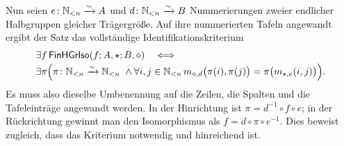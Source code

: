 \documentclass[main.tex]{subfiles}
\begin{document}
\begin{tabproofsplitwide}
  \closeproofpartwide
\end{tabproofsplitwide}

Nun seien \(e\colon\mathbb{N}_{<n}\xrightarrow{\sim} A\) und
\(d\colon\mathbb{N}_{<n}\xrightarrow{\sim} B\) Nummerierungen zweier endlicher
Halbgruppen gleicher Trägergröße.  Auf ihre nummerierten Tafeln
angewandt ergibt der Satz das vollständige Identifikationskriterium
\[
\begin{aligned}
&\exists f\,
  \mathsf{FinHGrIso}\!\left(f;A,\star;B,\diamond\right)
\quad\Longleftrightarrow{}\\[-2pt]
&\exists\pi\Bigl(
  \pi\colon\mathbb{N}_{<n}\xrightarrow{\sim}\mathbb{N}_{<n}\ \land
  \forall i,j\in\mathbb{N}_{<n}\,
  m_{\diamond,d}\bigl(\pi(i),\pi(j)\bigr)
    =\pi\bigl(m_{\star,e}(i,j)\bigr)
  \Bigr).
\end{aligned}
\]
Es muss also dieselbe Umbenennung auf die Zeilen, die Spalten und die
Tafeleinträge angewandt werden.  In der Hinrichtung ist
\(\pi=d^{-1}\circ f\circ e\); in der Rückrichtung gewinnt man den
Isomorphismus als \(f=d\circ\pi\circ e^{-1}\).  Dies beweist zugleich,
dass das Kriterium notwendig und hinreichend ist.
\end{document}
